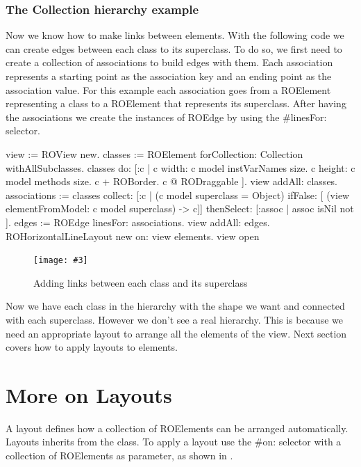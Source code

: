 \documentclass[a4paper,10pt,twoside]{book}
\newcommand{\fig}[4]{
		\begin{figure}[#1]
			\centering
			\texttt{[image: \#3]}
			\caption{\label{fig:#3}#4}
		\end{figure}}
\begin{document}
\subsubsection*{The Collection hierarchy example}
Now we know how to make links between elements. With the following code we can create edges between each class to its superclass. To do so, we first need to create a collection of associations to build edges with them. Each association represents a starting point as the association key and an ending point as the association value. For this example each association goes from a ROElement representing a class to a ROElement that represents its superclass. After having the associations we create the instances of ROEdge by using the \#linesFor: selector.

\begin{code}{}
view := ROView new.
classes := ROElement forCollection: Collection withAllSubclasses.
classes do: [:c | 
	c width: c model instVarNames size.
	c height: c model methods size.
	c + ROBorder. 
	c @ RODraggable ].
view addAll: classes.
associations := classes 
					collect: [:c | 	(c model superclass = Object)
										ifFalse: [ (view elementFromModel: c model superclass) -> c]]
					thenSelect: [:assoc | assoc isNil not ].
edges := ROEdge linesFor: associations.
view addAll: edges.
ROHorizontalLineLayout new on: view elements.
view open
\end{code}

\fig{H}{0.6}{hier3}{Adding links between each class and its superclass}

Now we have each class in the  hierarchy with the shape we want and connected with each superclass. However we don't see a real hierarchy. This is because we need an appropriate layout to arrange all the elements of the view. Next section covers how to apply layouts to elements.


\section{More on Layouts} 
A layout defines how a collection of ROElements can be arranged automatically. Layouts inherits from the  class. To apply a layout use the \#on: selector with a collection of ROElements as parameter, as shown in .
\end{document}
